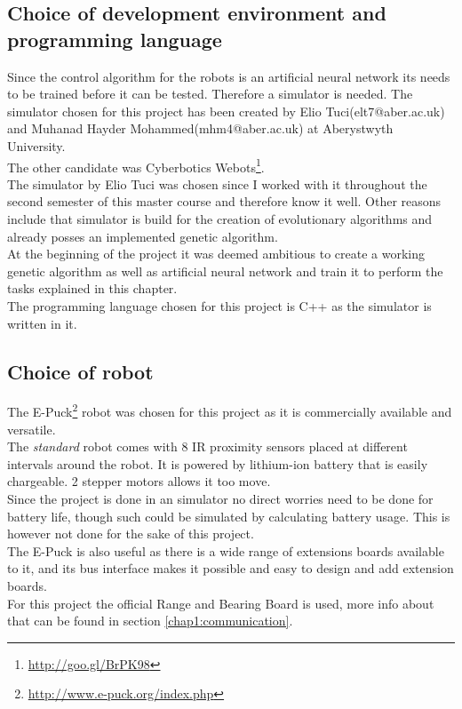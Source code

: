 \subsection{Choice of development environment and programming language}
Since the control algorithm for the robots is an artificial neural network its needs to be trained before it can be tested. Therefore a simulator is needed.
The simulator chosen for this project has been created by Elio Tuci(elt7@aber.ac.uk) and Muhanad Hayder Mohammed(mhm4@aber.ac.uk) at Aberystwyth University. \\
The other candidate was Cyberbotics Webots\footnote{\url{http://goo.gl/BrPK98}}. \\
The simulator by Elio Tuci was chosen since I worked with it throughout the second semester of this master course and therefore know it well. Other reasons include that simulator is build for the creation of evolutionary algorithms and already posses an implemented genetic algorithm. \\
At the beginning of the project it was deemed ambitious to create a working genetic algorithm as well as artificial neural network and train it to perform the tasks explained in this chapter. \\
The programming language chosen for this project is C++ as the simulator is written in it. 

\subsection{Choice of robot}
The E-Puck\footnote{\url{http://www.e-puck.org/index.php}} robot was chosen for this project as it is commercially available and versatile. \\
The \textit{standard} robot comes with 8 IR proximity sensors placed at different intervals around the robot. It is powered by lithium-ion battery that is easily chargeable. 2 stepper motors allows it too move\cite{mondada2009puck}. \\

Since the project is done in an simulator no direct worries need to be done for battery life, though such could be simulated by calculating battery usage. This is however not done for the sake of this project. \\

The E-Puck is also useful as there is a wide range of extensions boards available to it, and its bus interface makes it possible and easy to design and add extension boards. \\
For this project the official Range and Bearing Board is used, more info about that can be found in section \ref{chap1:communication}\cite{Gutierrez}.

